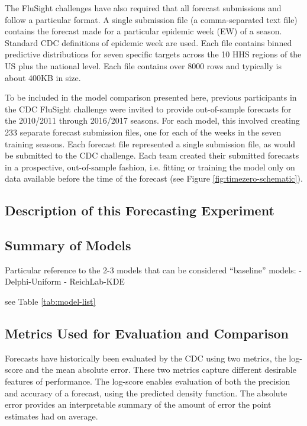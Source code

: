 \documentclass{article}
\begin{document}
The FluSight challenges have also required that all forecast submissions and follow a particular format. A single submission file (a comma-separated text file) contains the forecast made for a particular epidemic week (EW) of a season. Standard CDC definitions of epidemic week are used. Each file contains binned predictive distributions for seven specific targets across the 10 HHS regions of the US plus the national level. Each file contains over 8000 rows and typically is about 400KB in size.

To be included in the model comparison presented here, previous participants in the CDC FluSight challenge were invited to provide out-of-sample forecasts for the 2010/2011 through 2016/2017 seasons. For each model, this involved creating 233 separate forecast submission files, one for each of the weeks in the seven training seasons.
Each forecast file represented a single submission file, as would be submitted to the CDC challenge. 
Each team created their submitted forecasts in a prospective, out-of-sample fashion, i.e. fitting or training the model only on data available before the time of the forecast (see Figure \ref{fig:timezero-schematic}). 

\subsection{Description of this Forecasting Experiment}


\subsection{Summary of Models}

Particular reference to the 2-3 models that can be considered ``baseline'' models:
 - Delphi-Uniform
 - ReichLab-KDE

see Table \ref{tab:model-list}




\subsection{Metrics Used for Evaluation and Comparison}

Forecasts have historically been evaluated by the CDC using two metrics, the log-score and the mean absolute error. These two metrics capture different desirable features of performance. The log-score enables evaluation of both the precision and accuracy of a forecast, using the predicted density function.\cite{Gneiting2007} The absolute error provides an interpretable summary of the amount of error the point estimates had on average.\cite{Reich2016} 
\end{document}
